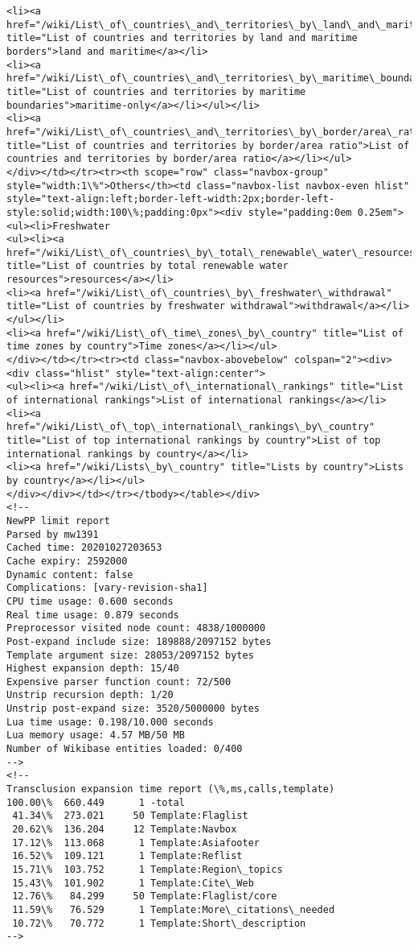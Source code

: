 \documentclass[11pt]{article}
\begin{document}
\begin{Verbatim}[commandchars=\\\{\}]
<li><a href="/wiki/List\_of\_countries\_and\_territories\_by\_land\_and\_maritime\_borders" title="List of countries and territories by land and maritime borders">land and maritime</a></li>
<li><a href="/wiki/List\_of\_countries\_and\_territories\_by\_maritime\_boundaries" title="List of countries and territories by maritime boundaries">maritime-only</a></li></ul></li>
<li><a href="/wiki/List\_of\_countries\_and\_territories\_by\_border/area\_ratio" title="List of countries and territories by border/area ratio">List of countries and territories by border/area ratio</a></li></ul>
</div></td></tr><tr><th scope="row" class="navbox-group" style="width:1\%">Others</th><td class="navbox-list navbox-even hlist" style="text-align:left;border-left-width:2px;border-left-style:solid;width:100\%;padding:0px"><div style="padding:0em 0.25em">
<ul><li>Freshwater
<ul><li><a href="/wiki/List\_of\_countries\_by\_total\_renewable\_water\_resources" title="List of countries by total renewable water resources">resources</a></li>
<li><a href="/wiki/List\_of\_countries\_by\_freshwater\_withdrawal" title="List of countries by freshwater withdrawal">withdrawal</a></li></ul></li>
<li><a href="/wiki/List\_of\_time\_zones\_by\_country" title="List of time zones by country">Time zones</a></li></ul>
</div></td></tr><tr><td class="navbox-abovebelow" colspan="2"><div><div class="hlist" style="text-align:center">
<ul><li><a href="/wiki/List\_of\_international\_rankings" title="List of international rankings">List of international rankings</a></li>
<li><a href="/wiki/List\_of\_top\_international\_rankings\_by\_country" title="List of top international rankings by country">List of top international rankings by country</a></li>
<li><a href="/wiki/Lists\_by\_country" title="Lists by country">Lists by country</a></li></ul>
</div></div></td></tr></tbody></table></div>
<!-- 
NewPP limit report
Parsed by mw1391
Cached time: 20201027203653
Cache expiry: 2592000
Dynamic content: false
Complications: [vary‐revision‐sha1]
CPU time usage: 0.600 seconds
Real time usage: 0.879 seconds
Preprocessor visited node count: 4838/1000000
Post‐expand include size: 189888/2097152 bytes
Template argument size: 28053/2097152 bytes
Highest expansion depth: 15/40
Expensive parser function count: 72/500
Unstrip recursion depth: 1/20
Unstrip post‐expand size: 3520/5000000 bytes
Lua time usage: 0.198/10.000 seconds
Lua memory usage: 4.57 MB/50 MB
Number of Wikibase entities loaded: 0/400
-->
<!--
Transclusion expansion time report (\%,ms,calls,template)
100.00\%  660.449      1 -total
 41.34\%  273.021     50 Template:Flaglist
 20.62\%  136.204     12 Template:Navbox
 17.12\%  113.068      1 Template:Asiafooter
 16.52\%  109.121      1 Template:Reflist
 15.71\%  103.752      1 Template:Region\_topics
 15.43\%  101.902      1 Template:Cite\_Web
 12.76\%   84.299     50 Template:Flaglist/core
 11.59\%   76.529      1 Template:More\_citations\_needed
 10.72\%   70.772      1 Template:Short\_description
-->


\end{Verbatim}
\end{document}
